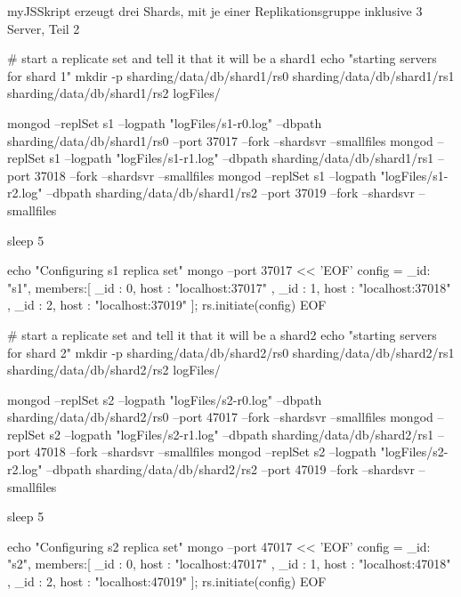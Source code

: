 \begin{listingsboxJavaScript}[label={lst:initReplica}]{myJS}{Skript erzeugt drei Shards, mit je einer Replikationsgruppe inklusive 3 Server, Teil 2}

# start a replicate set and tell it that it will be a shard1
echo "starting servers for shard 1"
mkdir -p sharding/data/db/shard1/rs0 sharding/data/db/shard1/rs1 
sharding/data/db/shard1/rs2 logFiles/

mongod --replSet s1 --logpath "logFiles/s1-r0.log" 
--dbpath sharding/data/db/shard1/rs0 --port 37017 --fork --shardsvr --smallfiles
mongod --replSet s1 --logpath "logFiles/s1-r1.log" 
--dbpath sharding/data/db/shard1/rs1 --port 37018 --fork --shardsvr --smallfiles
mongod --replSet s1 --logpath "logFiles/s1-r2.log" 
--dbpath sharding/data/db/shard1/rs2 --port 37019 --fork --shardsvr --smallfiles

sleep 5

echo "Configuring s1 replica set"
mongo --port 37017 << 'EOF'
config = { _id: "s1", members:[
          { _id : 0, host : "localhost:37017" },
          { _id : 1, host : "localhost:37018" },
          { _id : 2, host : "localhost:37019" }]};
rs.initiate(config)
EOF

# start a replicate set and tell it that it will be a shard2
echo "starting servers for shard 2"
mkdir -p sharding/data/db/shard2/rs0 sharding/data/db/shard2/rs1 
sharding/data/db/shard2/rs2 logFiles/

mongod --replSet s2 --logpath "logFiles/s2-r0.log" 
--dbpath sharding/data/db/shard2/rs0 --port 47017 --fork --shardsvr --smallfiles
mongod --replSet s2 --logpath "logFiles/s2-r1.log" 
--dbpath sharding/data/db/shard2/rs1 --port 47018 --fork --shardsvr --smallfiles
mongod --replSet s2 --logpath "logFiles/s2-r2.log" 
--dbpath sharding/data/db/shard2/rs2 --port 47019 --fork --shardsvr --smallfiles

sleep 5

echo "Configuring s2 replica set"
mongo --port 47017 << 'EOF'
config = { _id: "s2", members:[
          { _id : 0, host : "localhost:47017" },
          { _id : 1, host : "localhost:47018" },
          { _id : 2, host : "localhost:47019" }]};
rs.initiate(config)
EOF
\end{listingsboxJavaScript}


